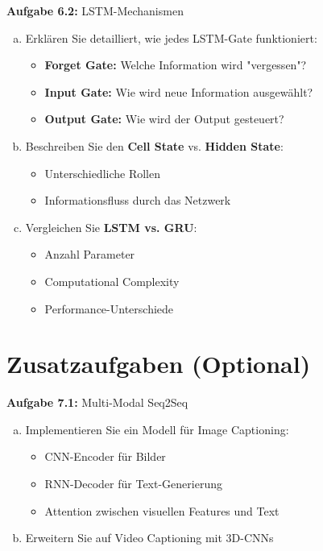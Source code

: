 \documentclass[12pt,a4paper]{article}
\begin{document}
\textbf{Aufgabe 6.2:} LSTM-Mechanismen

\begin{enumerate}[(a)]
    \item Erklären Sie detailliert, wie jedes LSTM-Gate funktioniert:
    \begin{itemize}
        \item \textbf{Forget Gate:} Welche Information wird "vergessen"?
        \item \textbf{Input Gate:} Wie wird neue Information ausgewählt?
        \item \textbf{Output Gate:} Wie wird der Output gesteuert?
    \end{itemize}
    \item Beschreiben Sie den \textbf{Cell State} vs. \textbf{Hidden State}:
    \begin{itemize}
        \item Unterschiedliche Rollen
        \item Informationsfluss durch das Netzwerk
    \end{itemize}
    \item Vergleichen Sie \textbf{LSTM vs. GRU}:
    \begin{itemize}
        \item Anzahl Parameter
        \item Computational Complexity
        \item Performance-Unterschiede
    \end{itemize}
\end{enumerate}

\section{Zusatzaufgaben (Optional)}

\textbf{Aufgabe 7.1:} Multi-Modal Seq2Seq

\begin{enumerate}[(a)]
    \item Implementieren Sie ein Modell für Image Captioning:
    \begin{itemize}
        \item CNN-Encoder für Bilder
        \item RNN-Decoder für Text-Generierung
        \item Attention zwischen visuellen Features und Text
    \end{itemize}
    \item Erweitern Sie auf Video Captioning mit 3D-CNNs
\end{enumerate}
\end{document}
